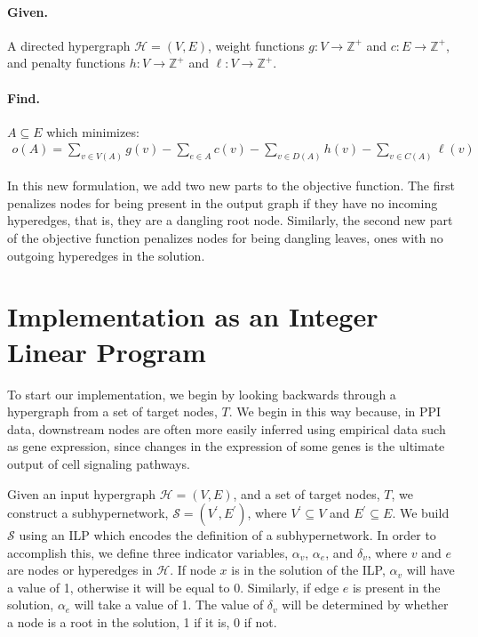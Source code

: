 \documentclass[12pt,twoside]{reedthesis}
\theoremstyle{definition}
\begin{document}
\hfill\begin{minipage}{\dimexpr\textwidth-2cm}
\paragraph{Given.}A directed hypergraph $\mathcal{H}=(V,E)$, weight functions $g:V \rightarrow \mathbb{Z}^+$ and $c:E \rightarrow \mathbb{Z}^+$, and penalty functions $h:V \rightarrow \mathbb{Z}^+$ and $\ell:V \rightarrow \mathbb{Z}^+$.
\paragraph{Find.}$A \subseteq E$ which minimizes:
\begin{align*}
  o(A) = \sum_{v \in V(A)}g(v) - \sum_{e \in A}c(v) - \sum_{v \in D(A)}h(v) - \sum_{v \in C(A)}\ell(v)
\end{align*}
\end{minipage}
\bigbreak
In this new formulation, we add two new parts to the objective function. The first penalizes nodes for being present in the output graph if they have no incoming hyperedges, that is, they are a dangling root node. Similarly, the second new part of the objective function penalizes nodes for being dangling leaves, ones with no outgoing hyperedges in the solution.

\section{Implementation as an Integer Linear Program}

To start our implementation, we begin by looking backwards through a hypergraph from a set of target nodes, $T$. We begin in this way because, in PPI data, downstream nodes are often more easily inferred using empirical data such as gene expression, since changes in the expression of some genes is the ultimate output of cell signaling pathways.

Given an input hypergraph $\mathcal{H}=(V,E)$, and a set of target nodes, $T$, we construct a subhypernetwork, $\mathcal{S}= (V^\prime,E^\prime)$, where $V^\prime \subseteq V$ and $E^\prime \subseteq E$.  We build $\mathcal{S}$ using an ILP which encodes the definition of a subhypernetwork.  In order to accomplish this, we define three indicator variables, $\alpha_v$, $\alpha_e$, and $\delta_v$, where $v$ and $e$ are nodes or hyperedges in $\mathcal{H}$.  If node $x$ is in the solution of the ILP, $\alpha_v$ will have a value of 1, otherwise it will be equal to 0.  Similarly, if edge $e$ is present in the solution, $\alpha_e$ will take a value of 1. The value of $\delta_v$ will be determined by whether a node is a root in the solution, 1 if it is, 0 if not.\par
\end{document}
